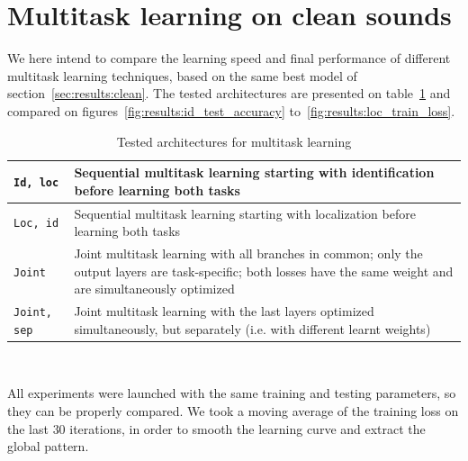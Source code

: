\section{Multitask learning on clean sounds}
\label{sec:results:multi}

We here intend to compare the learning speed and final performance of different multitask learning techniques, based on the same best model of section~\ref{sec:results:clean}. The tested architectures are presented on table~\ref{fig:results:multitask} and compared on figures~\ref{fig:results:id_test_accuracy} to~\ref{fig:results:loc_train_loss}.

\renewcommand{\arraystretch}{1.5}
\begin{table}[htb]
\begin{tabular}{|p{}|p{}|}
\hline
\verb+Id, loc+ & Sequential multitask learning starting with identification before learning both tasks \\
\hline
\verb+Loc, id+ & Sequential multitask learning starting with localization before learning both tasks \\
\hline
\verb+Joint+ & Joint multitask learning with all branches in common; only the output layers are task-specific; both losses have the same weight and are simultaneously optimized \\
\hline
\verb+Joint, sep+ & Joint multitask learning with the last layers optimized simultaneously, but separately (i.e. with different learnt weights) \\
\hline
\end{tabular}
\\
\caption{Tested architectures for multitask learning}
\label{fig:results:multitask}
\end{table}

All experiments were launched with the same training and testing parameters, so they can be properly compared. We took a moving average of the training loss on the last $30$ iterations, in order to smooth the learning curve and extract the global pattern.

